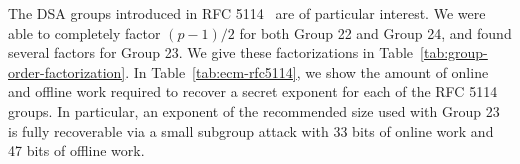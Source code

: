 The DSA groups introduced in RFC 5114~\cite{rfc5114} are of particular
interest. We were able to completely factor $(p-1)/2$ for both Group 22 and
Group 24, and found several factors for Group 23. We give these factorizations
in Table~\ref{tab:group-order-factorization}.
In Table~\ref{tab:ecm-rfc5114}, we show the amount of online and offline work
required to recover a secret exponent for each of the RFC 5114 groups. In
particular, an exponent of the recommended size used with Group 23 is fully
recoverable via a small subgroup attack with 33 bits of online work and 47 bits
of offline work.

\ECMBreakableGroups

\ECMRFCFiveFiveOneFourGroups

\GroupOrderFactorization
